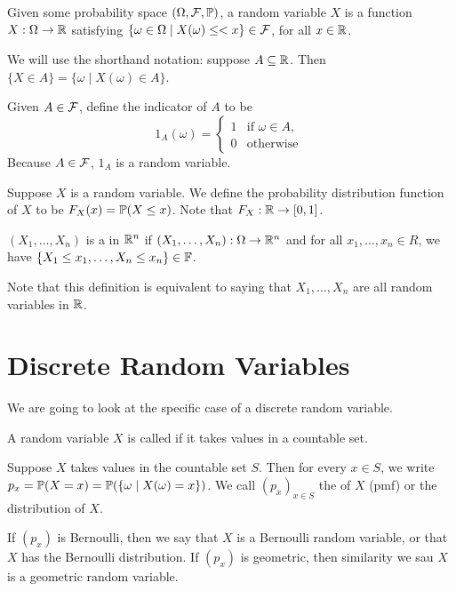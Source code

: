 \documentclass[a4paper]{scrreprt}
\begin{document}
Given some probability space $(\Omega, \mathcal{F}, \mathbb{P})$, a random variable $X$ is a function $X: \Omega \rightarrow \mathbb{R}$ satisfying $\{\omega \in \Omega \mid X(\omega)\leq< x \} \in \mathcal{F}$, for all $x \in \mathbb{R}$.

We will use the shorthand notation: suppose $A \subseteq \mathbb{R}$. Then $\{X \in A \} = \{\omega \mid X(\omega) \in A\}$.

Given $A \in \mathcal{F}$, define the indicator of $A$ to be
$$
1_A(\omega) = \begin{cases}
	1 &\mbox{if } \omega \in A, \\
	0 &\mbox{otherwise }
   \end{cases}
$$
Because $A \in \mathcal{F}$, $1_A$ is a random variable.

Suppose $X$ is a random variable. We define the probability distribution function of $X$ to be $F_X(x) = \mathbb{P}(X \leq x)$. Note that $F_X: \mathbb{R} \rightarrow [0, 1]$.

\begin{definition}
	$(X_1, \dots, X_n)$ is a  in $\mathbb{R}^n$ if $(X_1, \dots, X_n) : \Omega \rightarrow \mathbb{R}^n$ and for all $x_1, \dots, x_n \in R$, we have $\{X_1 \leq x_1, \dots, X_n \leq x_n\} \in \mathbb{F}$.
\end{definition}

Note that this definition is equivalent to saying that $X_1, \dots, X_n$ are all random variables in $\mathbb{R}$. 

\section{Discrete Random Variables}

We are going to look at the specific case of a discrete random variable.

\begin{definition}
	A random variable $X$ is called  if it takes values in a countable set.
\end{definition}

Suppose $X$ takes values in the countable set $S$. Then for every $x \in S$, we write $p_x = \mathbb{P}(X = x) = \mathbb{P}(\{ \omega \mid X(\omega) = x\})$. We call $(p_x)_{x \in S}$ the  of $X$ (pmf) or the distribution of $X$.

If $(p_x)$ is Bernoulli, then we say that $X$ is a Bernoulli random variable, or that $X$ has the Bernoulli distribution.
If $(p_x)$ is geometric, then similarity we sau $X$ is a geometric random variable.
\end{document}
